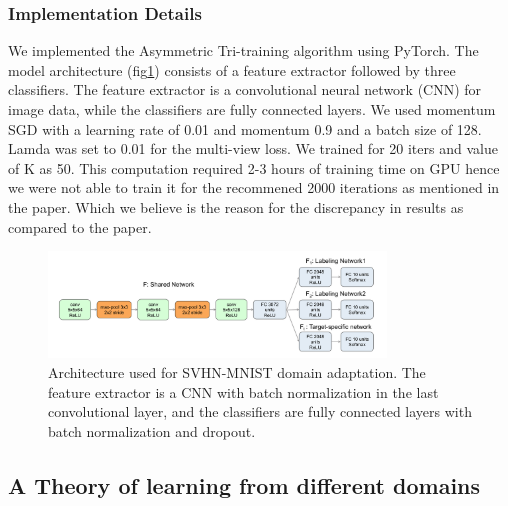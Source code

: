 \documentclass{article}
\begin{document}
\subsubsection{Implementation Details}
We implemented the Asymmetric Tri-training algorithm using PyTorch. The model architecture (fig\ref{fig:att_implementation}) consists of a feature extractor followed by three classifiers. The feature extractor is a convolutional neural network (CNN) for image data, while the classifiers are fully connected layers. We used momentum SGD with a learning rate of 0.01 and momentum 0.9 and a batch size of 128. Lamda was set to 0.01 for the multi-view loss. We trained for 20 iters and value of K as 50. This computation required 2-3 hours of training time on GPU hence we were not able to train it for the recommened 2000 iterations as mentioned in the paper. Which we believe is the reason for the discrepancy in results as compared to the paper.
\begin{figure}[h]
  \centering
  \includegraphics[width=0.8\textwidth]{ATT/Imp_acc.png}
  \caption{Architecture used for SVHN-MNIST domain adaptation. The feature extractor is a CNN with batch normalization in the last convolutional layer, and the classifiers are fully connected layers with batch normalization and dropout.}
  \label{fig:att_implementation}
\end{figure}

\subsection{A Theory of learning from different domains}
\end{document}
